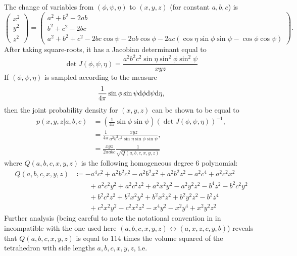 \documentclass[notitlepage]{article}
\begin{document}
The change of variables from $(\phi,\psi,\eta)$ to $(x,y,z)$ (for constant $a,b,c$) is
\begin{equation}
    \begin{pmatrix}
        x^2 \\ y^2 \\ z^2
    \end{pmatrix}
    =
    \begin{pmatrix}
        a^2 + b^2 - 2ab \\ 
        b^2 + c^2 - 2bc \\ 
        a^2 + b^2 + c^2 - 2bc \cos \psi - 2 ab \cos \phi - 2 ac(\cos \eta \sin \phi \sin \psi -\cos \phi \cos\psi)
    \end{pmatrix}.
\end{equation}
After taking square-roots, it has a Jacobian determinant equal to
\begin{equation}
    \det J(\phi, \psi, \eta) = \frac{a^2b^2c^2 \sin \eta \sin^2 \phi \sin^2 \psi}{xyz}
\end{equation}
If $(\phi, \psi, \eta)$ is sampled according to the measure 
\begin{equation}
    \frac{1}{4 \pi}\sin \phi \sin \psi \mathrm{d} \phi \mathrm{d} \psi \mathrm{d} \eta,
\end{equation}
then the joint probability density for $(x,y,z)$ can be shown to be equal to
\begin{align}
    p(x,y,z|a,b,c) 
    &= \left(\frac{1}{4\pi}\sin \phi \sin \psi\right) \left(\det J(\phi, \psi, \eta)\right)^{-1}, \\
    &= \frac{1}{4\pi} \frac{xyz}{a^2b^2c^2 \sin \eta \sin \phi \sin \psi}, \\
    &= \frac{xyz}{2 \pi abc}\frac{1}{\sqrt{Q(a,b,c,x,y,z)}}
\end{align}
where $Q(a,b,c,x,y,z)$ is the following homogeneous degree $6$ polynomial:
\begin{align}
    Q(a,b,c,x,y,z) 
    &\coloneqq
    -a^4 c^2+a^2 b^2 c^2-a^2 b^2 x^2+a^2 b^2 z^2-a^2c^4+a^2 c^2 x^2\\&\qquad+a^2 c^2 y^2+a^2 c^2 z^2+a^2 x^2 y^2-a^2 y^2 z^2-b^4 z^2-b^2 c^2 y^2\\&\qquad+b^2 c^2 z^2+b^2 x^2 y^2 +b^2 x^2 z^2+b^2 y^2 z^2-b^2 z^4\\&\qquad+c^2 x^2 y^2-c^2 x^2 z^2-x^4 y^2-x^2 y^4+x^2 y^2 z^2
\end{align}
Further analysis \cite{richardson1902trigonometry} (being careful to note the notational convention in \cite{richardson1902trigonometry} in incompatible with the one used here $(a,b,c,x,y,z)\leftrightarrow (a,x,z,c,y,b)$) reveals that $Q(a,b,c,x,y,z)$ is equal to $114$ times the volume squared of the tetrahedron with side lengths $a,b,c,x,y,z$, i.e.
\end{document}
